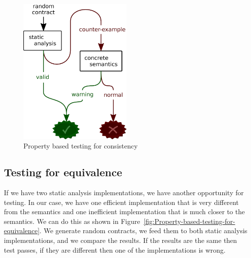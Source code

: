 \documentclass[english,runningheads]{llncs}
\begin{document}
\begin{figure}
\begin{centering}
\includegraphics[width=0.5\textwidth]{figures/consistency_property}
\par\end{centering}
\caption{Property based testing for consistency\label{fig:Property-based-testing-for-consistency}}

\end{figure}


\subsection{Testing for equivalence\label{subsec:Testing-for-equivalence} }

If we have two static analysis implementations, we have another opportunity
for testing. In our case, we have one efficient implementation that
is very different from the semantics and one inefficient implementation
that is much closer to the semantics. We can do this as shown in Figure~\ref{fig:Property-based-testing-for-equivalence}.
We generate random contracts, we feed them to both static analysis
implementations, and we compare the results. If the results are the
same then test passes, if they are different then one of the implementations
is wrong.
\end{document}
